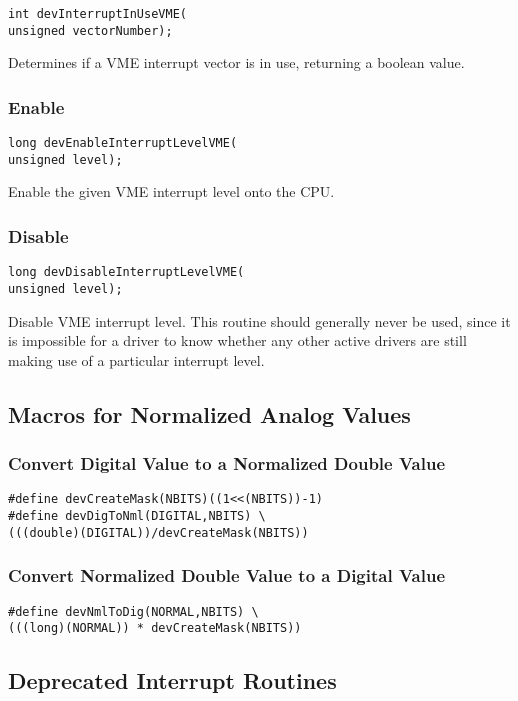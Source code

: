 \begin{verbatim}int devInterruptInUseVME(
unsigned vectorNumber);
\end{verbatim}Determines if a VME interrupt vector is in use, returning a boolean value.

\subsubsection{Enable}

\begin{verbatim}long devEnableInterruptLevelVME(
unsigned level);
\end{verbatim}Enable the given VME interrupt level onto the CPU.

\subsubsection{Disable}

\begin{verbatim}long devDisableInterruptLevelVME(
unsigned level);
\end{verbatim}Disable VME interrupt level. This routine should generally never be used, since it is impossible for a driver to know 
whether any other active drivers are still making use of a particular interrupt level.

\subsection{Macros for Normalized Analog Values}

\subsubsection{Convert Digital Value to a Normalized Double Value}

\begin{verbatim}#define devCreateMask(NBITS)((1<<(NBITS))-1)
#define devDigToNml(DIGITAL,NBITS) \
(((double)(DIGITAL))/devCreateMask(NBITS))
\end{verbatim}\subsubsection{Convert Normalized Double Value to a Digital Value}

\begin{verbatim}#define devNmlToDig(NORMAL,NBITS) \
(((long)(NORMAL)) * devCreateMask(NBITS))
\end{verbatim}\index{devNmlToDig}\subsection{Deprecated Interrupt Routines}


